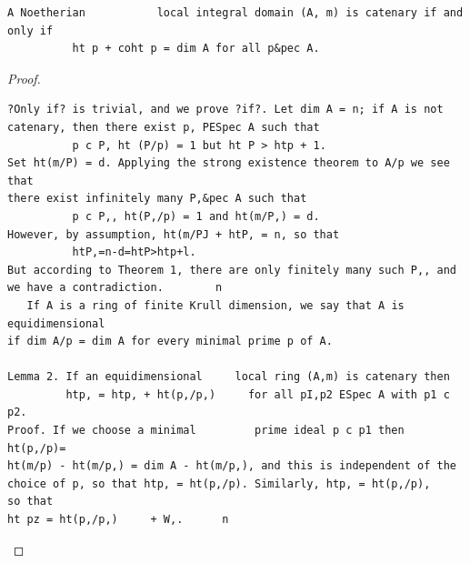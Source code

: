 \begin{theorem}\label{mcrt-auto-theorem-31-4}\uses{}
\begin{verbatim}
A Noetherian           local integral domain (A, m) is catenary if and
only if
          ht p + coht p = dim A for all p&pec A.
\end{verbatim}
\end{theorem}
\begin{proof}
\begin{verbatim}
?Only if? is trivial, and we prove ?if?. Let dim A = n; if A is not
catenary, then there exist p, PESpec A such that
          p c P, ht (P/p) = 1 but ht P > htp + 1.
Set ht(m/P) = d. Applying the strong existence theorem to A/p we see that
there exist infinitely many P,&pec A such that
          p c P,, ht(P,/p) = 1 and ht(m/P,) = d.
However, by assumption, ht(m/PJ + htP, = n, so that
          htP,=n-d=htP>htp+l.
But according to Theorem 1, there are only finitely many such P,, and
we have a contradiction.        n
   If A is a ring of finite Krull dimension, we say that A is equidimensional
if dim A/p = dim A for every minimal prime p of A.

Lemma 2. If an equidimensional     local ring (A,m) is catenary then
         htp, = htp, + ht(p,/p,)     for all pI,p2 ESpec A with p1 c p2.
Proof. If we choose a minimal         prime ideal p c p1 then ht(p,/p)=
ht(m/p) - ht(m/p,) = dim A - ht(m/p,), and this is independent of the
choice of p, so that htp, = ht(p,/p). Similarly, htp, = ht(p,/p),    so that
ht pz = ht(p,/p,)     + W,.      n
\end{verbatim}
\end{proof}


